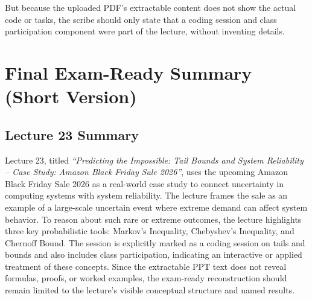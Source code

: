 \documentclass[11pt]{article}
\begin{document}
But because the uploaded PDF's extractable content does not show the actual code or tasks, the scribe should only state that a coding session and class participation component were part of the lecture, without inventing details.

\section{Final Exam-Ready Summary (Short Version)}

\subsection*{Lecture 23 Summary}

Lecture 23, titled \textit{``Predicting the Impossible: Tail Bounds and System Reliability -- Case Study: Amazon Black Friday Sale 2026''}, uses the upcoming Amazon Black Friday Sale 2026 as a real-world case study to connect uncertainty in computing systems with system reliability. The lecture frames the sale as an example of a large-scale uncertain event where extreme demand can affect system behavior. To reason about such rare or extreme outcomes, the lecture highlights three key probabilistic tools: Markov's Inequality, Chebyshev's Inequality, and Chernoff Bound. The session is explicitly marked as a coding session on tails and bounds and also includes class participation, indicating an interactive or applied treatment of these concepts. Since the extractable PPT text does not reveal formulas, proofs, or worked examples, the exam-ready reconstruction should remain limited to the lecture's visible conceptual structure and named results.
\end{document}
